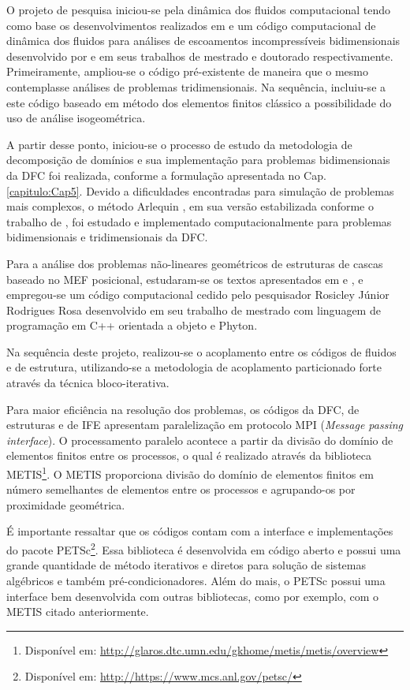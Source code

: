 \documentclass[tese_patricia.tex]{subfiles}
\begin{document}
O projeto de pesquisa iniciou-se pela dinâmica dos fluidos computacional tendo como base os desenvolvimentos realizados em  e 
um código computacional de dinâmica dos fluidos para análises de escoamentos incompressíveis bidimensionais desenvolvido por  e  em seus trabalhos de mestrado e doutorado respectivamente. Primeiramente, ampliou-se o código pré-existente de maneira que o mesmo contemplasse análises de problemas tridimensionais. Na sequência, incluiu-se a este código baseado em método dos elementos finitos clássico a possibilidade do uso de análise isogeométrica.

A partir desse ponto, iniciou-se o processo de estudo da metodologia de decomposição de domínios e sua implementação para problemas bidimensionais da DFC foi realizada, conforme a formulação apresentada no Cap. \ref{capitulo:Cap5}. Devido a dificuldades encontradas para simulação de problemas mais complexos, o método Arlequin \cite{Dhia:1998}, em sua versão estabilizada conforme o trabalho de , foi estudado e implementado computacionalmente para problemas bidimensionais e tridimensionais da DFC.

Para a análise dos problemas não-lineares geométricos de estruturas de cascas baseado no MEF posicional, estudaram-se os textos apresentados em  e , e empregou-se um código computacional cedido pelo pesquisador Rosicley Júnior Rodrigues Rosa desenvolvido em seu trabalho de mestrado  \cite{Rosa:2021} com linguagem de programação em C++ orientada a objeto e Phyton.

Na sequência deste projeto, realizou-se o acoplamento entre os códigos de fluidos e de estrutura, utilizando-se a metodologia de acoplamento particionado forte através da técnica bloco-iterativa.

Para maior eficiência na resolução dos problemas, os códigos da DFC, de estruturas e de IFE apresentam paralelização em protocolo MPI (\textit{Message passing interface}). O processamento paralelo acontece a partir da divisão do domínio de elementos finitos entre os processos, o qual é realizado através da biblioteca METIS\footnote{Disponível em: \url{http://glaros.dtc.umn.edu/gkhome/metis/metis/overview}}. O METIS proporciona divisão do domínio de elementos finitos em número semelhantes de elementos entre os processos e agrupando-os por proximidade geométrica.

É importante ressaltar que os códigos contam com a interface e implementações do pacote PETSc\footnote{Disponível em: \url{http://https://www.mcs.anl.gov/petsc/}}. Essa biblioteca é desenvolvida em código aberto e possui uma grande quantidade de método iterativos e diretos para solução de sistemas algébricos e também pré-condicionadores. Além do mais, o PETSc possui uma interface bem desenvolvida com outras bibliotecas, como por exemplo, com o METIS citado anteriormente. 
\end{document}
